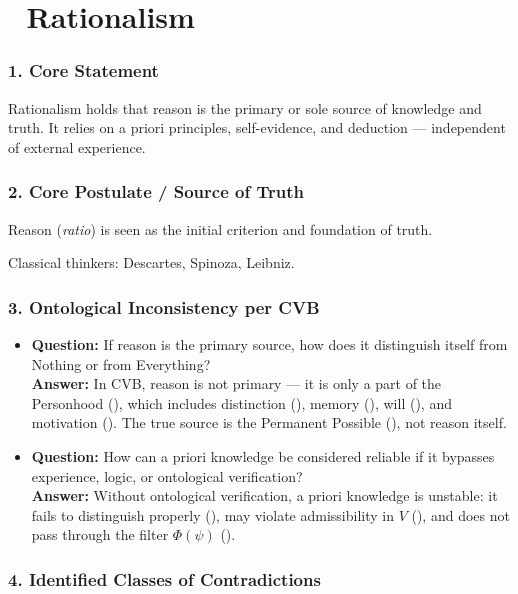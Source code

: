 \documentclass[12pt]{article}
\begin{document}
\section*{🔷 Rationalism}

\subsubsection*{1. Core Statement}

Rationalism holds that reason is the primary or sole source of knowledge and truth. It relies on a priori principles, self-evidence, and deduction — independent of external experience.

\subsubsection*{2. Core Postulate / Source of Truth}

Reason (\textit{ratio}) is seen as the initial criterion and foundation of truth.

Classical thinkers: Descartes, Spinoza, Leibniz.

\subsubsection*{3. Ontological Inconsistency per CVB}

\begin{itemize}
\item \textbf{Question:} If reason is the primary source, how does it distinguish itself from Nothing or from Everything?  
\\ \textbf{Answer:} In CVB, reason is not primary — it is only a part of the Personhood (\text{[12]}), which includes distinction (\text{[9]}), memory (\text{[10.3]}), will (\text{[10.6]}), and motivation (\text{[12.3]}). The true source is the Permanent Possible (\text{[6]}), not reason itself.

\item \textbf{Question:} How can a priori knowledge be considered reliable if it bypasses experience, logic, or ontological verification?  
\\ \textbf{Answer:} Without ontological verification, a priori knowledge is unstable: it fails to distinguish properly (\text{[9]}), may violate admissibility in $V$ (\text{[4.4]}), and does not pass through the filter $\Phi(\psi)$ (\text{[11.1.1]}).
\end{itemize}

\subsubsection*{4. Identified Classes of Contradictions}
\end{document}
